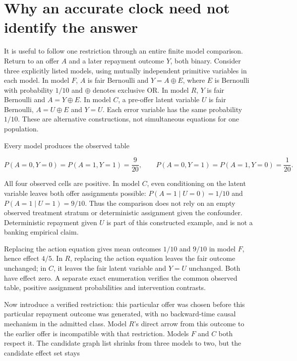 \hypertarget{why-an-accurate-clock-need-not-identify-the-answer}{%
\section{Why an accurate clock need not identify the
answer}\label{why-an-accurate-clock-need-not-identify-the-answer}}

It is useful to follow one restriction through an entire finite model
comparison. Return to an offer \(A\) and a later repayment outcome
\(Y\), both binary. Consider three explicitly listed models, using
mutually independent primitive variables in each model. In model \(F\),
\(A\) is fair Bernoulli and \(Y=A\mathbin{\oplus}E\), where \(E\) is
Bernoulli with probability \(1/10\) and \(\oplus\) denotes exclusive OR.
In model \(R\), \(Y\) is fair Bernoulli and \(A=Y\mathbin{\oplus}E\). In
model \(C\), a pre-offer latent variable \(U\) is fair Bernoulli,
\(A=U\mathbin{\oplus}E\) and \(Y=U\). Each error variable has the same
probability \(1/10\). These are alternative constructions, not
simultaneous equations for one population.

Every model produces the observed table

\[
 P(A=0,Y=0)=P(A=1,Y=1)=\frac9{20},\qquad
 P(A=0,Y=1)=P(A=1,Y=0)=\frac1{20}.
\]

All four observed cells are positive. In model \(C\), even conditioning
on the latent variable leaves both offer assignments possible:
\(P(A=1\mid U=0)=1/10\) and \(P(A=1\mid U=1)=9/10\). Thus the comparison
does not rely on an empty observed treatment stratum or deterministic
assignment given the confounder. Deterministic repayment given \(U\) is
part of this constructed example, and is not a banking empirical claim.

Replacing the action equation gives mean outcomes \(1/10\) and \(9/10\)
in model \(F\), hence effect \(4/5\). In \(R\), replacing the action
equation leaves the fair outcome unchanged; in \(C\), it leaves the fair
latent variable and \(Y=U\) unchanged. Both have effect zero. A separate
exact enumeration verifies the common observed table, positive
assignment probabilities and intervention contrasts.
\citep{exec13_diagram_restrictions}

Now introduce a verified restriction: this particular offer was chosen
before this particular repayment outcome was generated, with no
backward-time causal mechanism in the admitted class. Model \(R\)'s
direct arrow from this outcome to the earlier offer is incompatible with
that restriction. Models \(F\) and \(C\) both respect it. The candidate
graph list shrinks from three models to two, but the candidate effect
set stays

